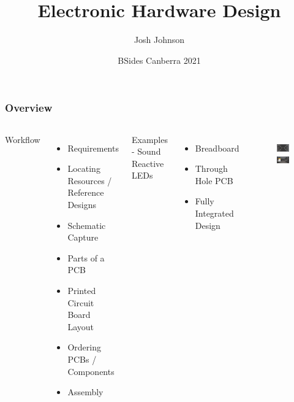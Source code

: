 \documentclass[aspectratio=169, t]{beamer}
\title[Electronic Hardware Design]{Electronic Hardware Design}
\author{Josh Johnson}
\date{BSides Canberra 2021}
\begin{document}
\begin{frame}
\titlepage
\end{frame}

\begin{frame}
\frametitle{Overview}
\begin{columns}
		Workflow
		\begin{itemize}
			\item Requirements
			\item Locating Resources / Reference Designs
			\item Schematic Capture
			\item Parts of a PCB
			\item Printed Circuit Board Layout
			\item Ordering PCBs / Components
			\item Assembly
		\end{itemize}
		Examples - Sound Reactive LEDs
		\begin{itemize}
			\item Breadboard
			\item Through Hole PCB
			\item Fully Integrated Design
		\end{itemize}
	
		\vspace{-8mm}
		\begin{figure}
			\includegraphics[width=0.9\linewidth]{images/bowtie-front.JPG}
			\includegraphics[width=0.9\linewidth]{images/bowtie-back.JPG}
		\end{figure}
\end{columns}
\end{frame}
\end{document}
